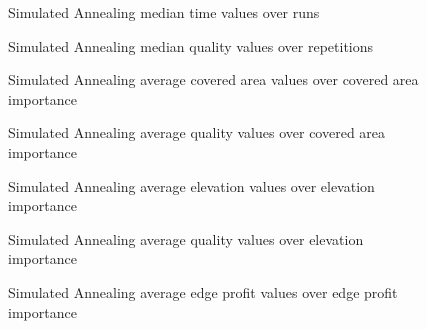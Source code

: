 \begin{figure}[H]
	\centering
	
	\caption{Simulated Annealing median time values over runs}
	\label{fig:SATimeOverRuns}
\end{figure}

\begin{figure}[H]
	\centering
	
	\caption{Simulated Annealing median quality values over repetitions}
	\label{fig:SAQualityRepititions}
\end{figure}





\begin{figure}[H]
	\centering
	
	\caption{Simulated Annealing average covered area values over covered area importance}
	\label{fig:SAAreaAvg}
\end{figure}

\begin{figure}[H]
	\centering
	
	\caption{Simulated Annealing average quality values over covered area importance}
	\label{fig:SAAreaQualityAvg}
\end{figure}




\begin{figure}[H]
	\centering
	
	\caption{Simulated Annealing average elevation values over elevation importance}
	\label{fig:SAElevationAvg}
\end{figure}



\begin{figure}[H]
	\centering
	
	\caption{Simulated Annealing average quality values over elevation importance}
	\label{fig:SAQualityElevationAvg}
\end{figure}



\begin{figure}[H]
	\centering
	
	\caption{Simulated Annealing average edge profit values over edge profit importance}
	\label{fig:SAProfitAvg}
\end{figure}


